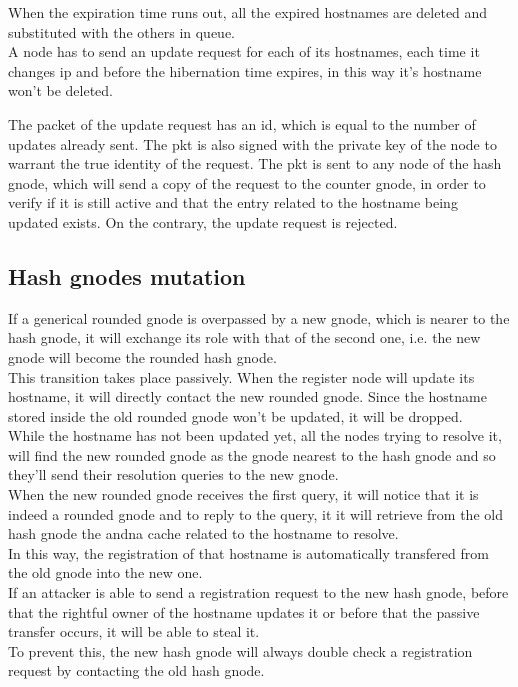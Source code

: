 \documentclass[a4paper]{article}
\begin{document}
When the expiration time runs out, all the expired hostnames are deleted and
substituted with the others in queue.\\
A node has to send an update request for each of its hostnames, each time it
changes ip and before the hibernation time expires, in this way it's
hostname won't be deleted.

The packet of the update request has an id, which is equal to the number of
updates already sent. The pkt is also signed with the private key of the
node to warrant the true identity of the request.
The pkt is sent to any node of the hash gnode, which will send a copy of the
request to the counter gnode, in order to verify if it is still active and
that the entry related to the hostname being updated exists. On the
contrary, the update request is rejected.

\subsection{Hash gnodes mutation}
 
If a generical rounded gnode is overpassed by a new gnode, which is nearer
to the hash gnode, it will exchange its role with that of the second one, i.e.
the new gnode will become the rounded hash gnode.\\

This transition takes place passively. When the register node will update
its hostname, it will directly contact the new rounded gnode. Since the
hostname stored inside the old rounded gnode won't be updated, it will be
dropped.\\

While the hostname has not been updated yet, all the nodes trying
to resolve it, will find the new rounded gnode as the gnode nearest to the
hash gnode and so they'll send their resolution queries to the new gnode.\\
When the  new rounded gnode receives the first query, it will notice that it
is indeed a rounded gnode and to reply to the query, it it will retrieve from
the old hash gnode the andna cache related to the hostname to resolve.\\
In this way, the registration of that hostname is automatically transfered
from the old gnode into the new one.\\

If an attacker is able to send a registration request to the new hash gnode,
before that the rightful owner of the hostname updates it or before that the
passive transfer occurs, it will be able to steal it.\\
To prevent this, the new hash gnode will always double check a registration
request by contacting the old hash gnode.
\end{document}

